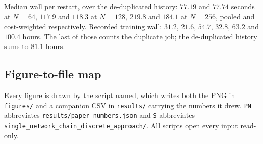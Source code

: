 \documentclass[11pt,a4paper]{article}
\begin{document}
Median wall per restart, over the de-duplicated history: $77.19$ and $77.74$
seconds at $N = 64$, $117.9$ and $118.3$ at $N = 128$, $219.8$ and $184.1$ at
$N = 256$, pooled and cost-weighted respectively. Recorded training wall:
$31.2$, $21.6$, $54.7$, $32.8$, $63.2$ and $100.4$ hours. The last of those
counts the duplicate job; the de-duplicated history sums to $81.1$ hours.

\subsection*{Figure-to-file map}

Every figure is drawn by the script named, which writes both the PNG in
\texttt{figures/} and a companion CSV in \texttt{results/} carrying the numbers
it drew. \texttt{PN} abbreviates \texttt{results/paper\_numbers.json} and
\texttt{S} abbreviates
\texttt{single\_network\_chain\_discrete\_approach/}. All scripts open every
input read-only.
\end{document}
